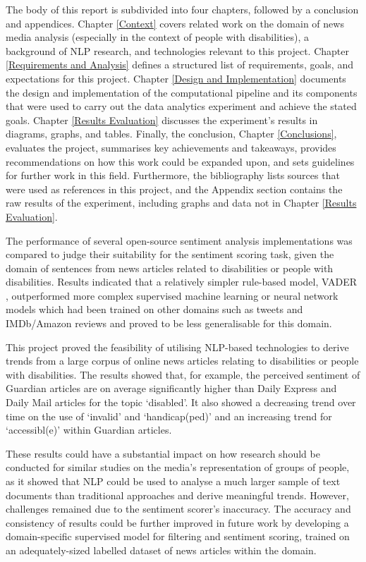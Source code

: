 \documentclass{report}
\begin{document}
The body of this report is subdivided into four chapters, followed by a conclusion and appendices.
Chapter \ref{Context} covers related work on the domain of news media analysis (especially in the context of people with disabilities), a background of NLP research, and technologies relevant to this project.
Chapter \ref{Requirements and Analysis} defines a structured list of requirements, goals, and expectations for this project.
Chapter \ref{Design and Implementation} documents the design and implementation of the computational pipeline and its components that were used to carry out the data analytics experiment and achieve the stated goals.
Chapter \ref{Results Evaluation} discusses the experiment's results in diagrams, graphs, and tables.
Finally, the conclusion, Chapter \ref{Conclusions}, evaluates the project, summarises key achievements and takeaways, provides recommendations on how this work could be expanded upon, and sets guidelines for further work in this field.
Furthermore, the bibliography lists sources that were used as references in this project, and the Appendix section contains the raw results of the experiment, including graphs and data not in Chapter \ref{Results Evaluation}.

The performance of several open-source sentiment analysis implementations was compared to judge their suitability for the sentiment scoring task, given the domain of sentences from news articles related to disabilities or people with disabilities.
Results indicated that a relatively simpler rule-based model, VADER \cite{VADER}, outperformed more complex supervised machine learning or neural network models which had been trained on other domains such as tweets and IMDb/Amazon reviews and proved to be less generalisable for this domain.

This project proved the feasibility of utilising NLP-based technologies to derive trends from a large corpus of online news articles relating to disabilities or people with disabilities.
The results showed that, for example, the perceived sentiment of Guardian articles are on average significantly higher than Daily Express and Daily Mail articles for the topic `disabled'.
It also showed a decreasing trend over time on the use of `invalid' and `handicap(ped)' and an increasing trend for `accessibl(e)' within Guardian articles.

These results could have a substantial impact on how research should be conducted for similar studies on the media's representation of groups of people, as it showed that NLP could be used to analyse a much larger sample of text documents than traditional approaches and derive meaningful trends.
However, challenges remained due to the sentiment scorer's inaccuracy.
The accuracy and consistency of results could be further improved in future work by developing a domain-specific supervised model for filtering and sentiment scoring, trained on an adequately-sized labelled dataset of news articles within the domain.   
\end{document}
